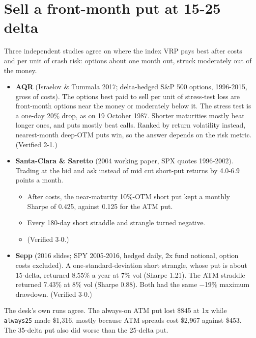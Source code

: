 \documentclass{article}
\begin{document}
\section{Sell a front-month put at 15-25 delta}

Three independent studies agree on where the index VRP pays best after costs and per unit of crash risk: options about one month out, struck moderately out of the money.

\begin{itemize}

\item \textbf{AQR} (Israelov \& Tummala 2017; delta-hedged S\&P 500 options, 1996-2015, gross of costs). The options best paid to sell per unit of stress-test loss are front-month options near the money or moderately below it. The stress test is a one-day 20\% drop, as on 19 October 1987. Shorter maturities mostly beat longer ones, and puts mostly beat calls. Ranked by return volatility instead, nearest-month deep-OTM puts win, so the answer depends on the risk metric. (Verified 2-1.)

\item \textbf{Santa-Clara \& Saretto} (2004 working paper, SPX quotes 1996-2002). Trading at the bid and ask instead of mid cut short-put returns by 4.0-6.9 points a month.

\begin{itemize}

\item After costs, the near-maturity 10\%-OTM short put kept a monthly Sharpe of 0.425, against 0.125 for the ATM put.

\item Every 180-day short straddle and strangle turned negative.

\item (Verified 3-0.)

\end{itemize}

\item \textbf{Sepp} (2016 slides; SPY 2005-2016, hedged daily, 2x fund notional, option costs excluded). A one-standard-deviation short strangle, whose put is about 15-delta, returned 8.55\% a year at 7\% vol (Sharpe 1.21). The ATM straddle returned 7.43\% at 8\% vol (Sharpe 0.88). Both had the same \ensuremath{-}19\% maximum drawdown. (Verified 3-0.)

\end{itemize}

The desk's own runs agree. The always-on ATM put lost \$845 at 1x while \texttt{always25} made \$1,316, mostly because ATM spreads cost \$2,967 against \$453. The 35-delta put also did worse than the 25-delta put.
\end{document}

